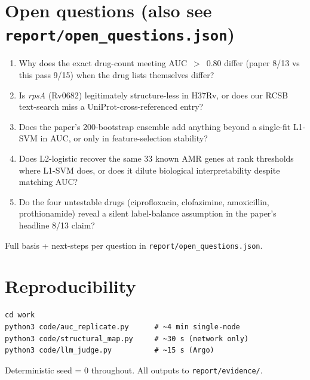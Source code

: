 \documentclass[11pt,letterpaper]{article}
\begin{document}
\section{Open questions (also see \texttt{report/open\_questions.json})}
\begin{enumerate}
  \item Why does the exact drug-count meeting AUC~$>$~0.80 differ (paper
        8/13 vs this pass 9/15) when the drug lists themselves differ?
  \item Is \emph{rpsA} (Rv0682) legitimately structure-less in H37Rv, or
        does our RCSB text-search miss a UniProt-cross-referenced entry?
  \item Does the paper's 200-bootstrap ensemble add anything beyond a
        single-fit L1-SVM in AUC, or only in feature-selection stability?
  \item Does L2-logistic recover the same 33 known AMR genes at rank
        thresholds where L1-SVM does, or does it dilute biological
        interpretability despite matching AUC?
  \item Do the four untestable drugs (ciprofloxacin, clofazimine,
        amoxicillin, prothionamide) reveal a silent label-balance
        assumption in the paper's headline 8/13 claim?
\end{enumerate}
Full basis + next-steps per question in \texttt{report/open\_questions.json}.

\section{Reproducibility}
\begin{verbatim}
cd work
python3 code/auc_replicate.py      # ~4 min single-node
python3 code/structural_map.py     # ~30 s (network only)
python3 code/llm_judge.py          # ~15 s (Argo)
\end{verbatim}
Deterministic seed = 0 throughout. All outputs to \texttt{report/evidence/}.
\end{document}
